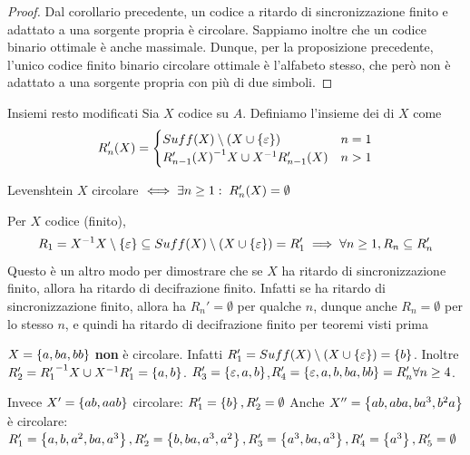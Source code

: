 \begin{proof}
  Dal corollario precedente, un codice a ritardo di sincronizzazione finito e adattato a una sorgente propria è circolare.
  Sappiamo inoltre che un codice binario ottimale è anche massimale.
  Dunque, per la proposizione precedente, l'unico codice finito binario circolare ottimale è l'alfabeto stesso, che però non è adattato a una sorgente propria con più di due simboli.
\end{proof}

\begin{definition}{Insiemi resto modificati}
  Sia \(X\) codice su \(A\). Definiamo l'insieme dei  di \(X\) come
  \begin{equation*}
    R_n'(X) = \begin{cases}
    Suff(X)\setminus (X \cup \set{\varepsilon}) & n = 1\\
    {R_{n-1}'(X)}^{-1}X \cup X^{-1}R_{n-1}'(X) & n > 1
    \end{cases}
  \end{equation*}
\end{definition}

\begin{theorem}{Levenshtein}
  \(X\) circolare \(\iff \exists n \geq 1 :\; R_n'(X) = \emptyset\)
\end{theorem}

\begin{observation}{}
  Per \(X\) codice (finito),
  \[R_1 = X^{-1}X\setminus \set{\varepsilon} \subseteq Suff(X) \setminus (X \cup \set{\varepsilon}) = R_1' \implies \forall n \geq 1, R_n \subseteq R_n'\]
  Questo è un altro modo per dimostrare che se \(X\) ha ritardo di sincronizzazione finito, allora ha ritardo di decifrazione finito.
  Infatti se ha ritardo di sincronizzazione finito, allora ha \(R_n' = \emptyset\) per qualche \(n\), dunque anche \(R_n = \emptyset\) per lo stesso \(n\), e quindi ha ritardo di decifrazione finito per teoremi visti prima 
\end{observation}

\begin{example}{}
  \(X = \set{a,ba,bb}\) \textbf{non} è circolare.
  Infatti \(R_1' = Suff(X) \setminus (X \cup \set{\varepsilon}) = \set{b}\).
  Inoltre \(R_2' = {R_1'}^{-1}X \cup X^{-1}R_1' = \set{a,b}\).
  \(R_3' = \set{\varepsilon, a ,b}\),\(R_4' = \set{\varepsilon, a ,b, ba,bb} = R_n' \forall n \geq 4\).

  Invece \(X' = \set{ab,aab}\) circolare: \(R_1' = \set{b}, R'_2 = \emptyset\)
  Anche \(X'' = \set{ab,aba,ba^3,b^2a}\) è circolare:
  \(R_1' = \set{a,b,a^2,ba,a^3}, R_2' = \set{b,ba,a^3,a^2}, R_3' = \set{a^3,ba,a^3}, R_4' = \set{a^3}, R_5' = \emptyset\)
\end{example}

